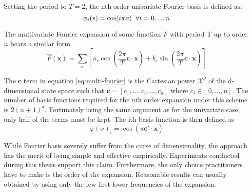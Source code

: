Setting the period to $T=2$, the nth order univariate Fourier basis is defined as:
\begin{equation}
\phi_i(s) = \cos(i\pi x) \hspace{2mm} \forall i = 0, ..., n
\end{equation}

The multivariate Fourier expansion of some function $F$ with period T up to order $n$
bears a similar form
\begin{equation}
\hat{F}(\mathbf{x}) = \sum_{\mathbf{c}} \left[ a_c \cos \left( \frac{2\pi}{T} \mathbf{c}
\cdot \mathbf{x} \right) +  b_c \sin \left( \frac{2\pi}{T} \mathbf{c} \cdot \mathbf{x}
\right)\right]
\label{eq:multi-fourier}
\end{equation}

The $\mathbf{c}$ term in equation \ref{eq:multi-fourier} is the Cartesian power 
$\mathcal{X}^d$ of the d-dimensional state space such that $\mathbf{c} = [c_1,
\dots, c_i, \dots, c_d]$ where $c_i \in [0, \dots, n]$. The number of basis functions
required for the nth order expansion under this scheme is $2(n+1)^d$.
Fortunately using the same argument as for the univariate case, only half of the terms
must be kept. The ith basis function is then defined as
\begin{equation}
\varphi(x)_i = \cos \left(  \pi \mathbf{c}^i \cdot \mathbf{x} \right)
\end{equation}

While Fourier basis severely suffer from the curse of dimensionality, the approach has
the merit of being simple and effective empirically.  Experiments conducted during this
thesis support this claim. Furthermore, the only choice practitioners have to make is the
order of the expansion. Reasonable results can usually obtained by using only the
few first lower frequencies of the expansion.
